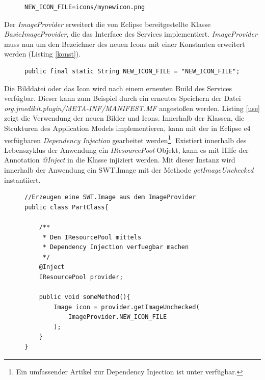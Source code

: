 \begin{figure}[htbp]
\begin{lstlisting}[frame=leftline]
NEW_ICON_FILE=icons/mynewicon.png
\end{lstlisting}

\end{figure}

Der \textit{ImageProvider} erweitert die von Eclipse bereitgestellte Klasse \textit{BasicImageProvider}, die das Interface des Services implementiert. \textit{ImageProvider} muss nun um den Bezeichner des neuen Icons mit einer Konstanten erweitert werden (Listing \ref{konst}).

\begin{figure}[htbp]
\begin{lstlisting}[frame=leftline]
public final static String NEW_ICON_FILE = "NEW_ICON_FILE";
\end{lstlisting}

\end{figure}

Die Bilddatei oder das Icon wird nach einem erneuten Build des Services verfügbar. Dieser kann zum Beispiel durch ein erneutes Speichern der Datei \textit{org.jmedikit.plugin/META-INF/MANIFEST.MF} angestoßen werden.
Listing \ref{use} zeigt die Verwendung der neuen Bilder und Icons. Innerhalb der Klassen, die Strukturen des Application Models implementieren, kann mit der in Eclipse e4 verfügbaren \textit{Dependency Injection} gearbeitet werden\footnote{Ein umfassender Artikel zur Dependency Injection ist unter \cite{vogel:di} verfügbar.}. Existiert innerhalb des Lebenszyklus der Anwendung ein \textit{IResourcePool}-Objekt, kann es mit Hilfe der Annotation \textit{@Inject} in die Klasse injiziert werden. Mit dieser Instanz wird innerhalb der Anwendung ein SWT.Image mit der Methode \textit{getImageUnchecked} instantiiert.
\begin{figure}[htbp]
\begin{lstlisting}[frame=leftline]
//Erzeugen eine SWT.Image aus dem ImageProvider
public class PartClass{

	/**
	 * Den IResourcePool mittels 
	 * Dependency Injection verfuegbar machen
	 */
	@Inject
	IResourcePool provider;
	
	public void someMethod(){
	 	Image icon = provider.getImageUnchecked(
			ImageProvider.NEW_ICON_FILE
	 	);
	}
}
\end{lstlisting}

\end{figure}

